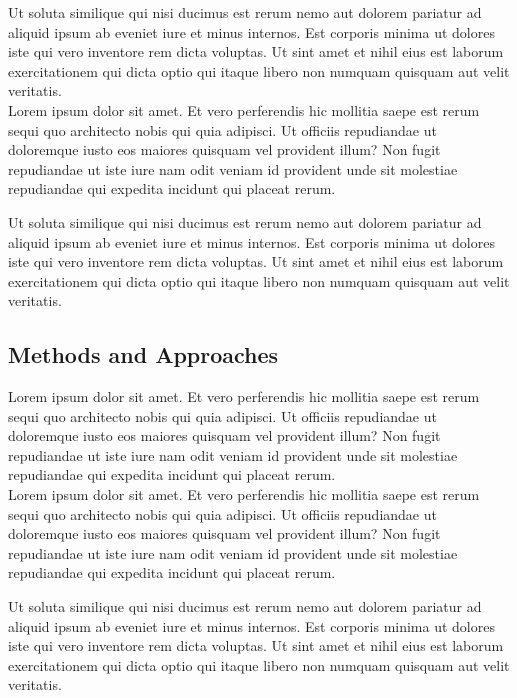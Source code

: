 \documentclass[12pt]{article}
\begin{document}
Ut soluta similique qui nisi ducimus est rerum nemo aut dolorem pariatur ad aliquid ipsum ab eveniet iure et minus internos. Est corporis minima ut dolores iste qui vero inventore rem dicta voluptas. Ut sint amet et nihil eius est laborum exercitationem qui dicta optio qui itaque libero non numquam quisquam aut velit veritatis.\\

\noindent Lorem ipsum dolor sit amet. Et vero perferendis hic mollitia saepe est rerum sequi quo architecto nobis qui quia adipisci. Ut officiis repudiandae ut doloremque iusto eos maiores quisquam vel provident illum? Non fugit repudiandae ut iste iure nam odit veniam id provident unde sit molestiae repudiandae qui expedita incidunt qui placeat rerum.

Ut soluta similique qui nisi ducimus est rerum nemo aut dolorem pariatur ad aliquid ipsum ab eveniet iure et minus internos. Est corporis minima ut dolores iste qui vero inventore rem dicta voluptas. Ut sint amet et nihil eius est laborum exercitationem qui dicta optio qui itaque libero non numquam quisquam aut velit veritatis.\\


\subsection{Methods and Approaches}

Lorem ipsum dolor sit amet. Et vero perferendis hic mollitia saepe est rerum sequi quo architecto nobis qui quia adipisci. Ut officiis repudiandae ut doloremque iusto eos maiores quisquam vel provident illum? Non fugit repudiandae ut iste iure nam odit veniam id provident unde sit molestiae repudiandae qui expedita incidunt qui placeat rerum.\\

\noindent Lorem ipsum dolor sit amet. Et vero perferendis hic mollitia saepe est rerum sequi quo architecto nobis qui quia adipisci. Ut officiis repudiandae ut doloremque iusto eos maiores quisquam vel provident illum? Non fugit repudiandae ut iste iure nam odit veniam id provident unde sit molestiae repudiandae qui expedita incidunt qui placeat rerum.

Ut soluta similique qui nisi ducimus est rerum nemo aut dolorem pariatur ad aliquid ipsum ab eveniet iure et minus internos. Est corporis minima ut dolores iste qui vero inventore rem dicta voluptas. Ut sint amet et nihil eius est laborum exercitationem qui dicta optio qui itaque libero non numquam quisquam aut velit veritatis.\\
\end{document}
